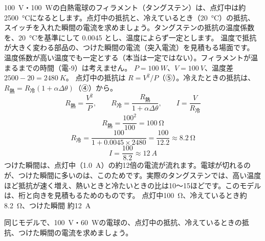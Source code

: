 \label{ph:電-4:ex5}
\begin{phreidai}[電球をつけた瞬間の電流]
\qty{100}{V}・\qty{100}{W}の白熱電球のフィラメント（タングステン）は、点灯中は約\qty{2500}{\celsius}になるとします。点灯中の抵抗と、冷えているとき（\qty{20}{\celsius}）の抵抗、スイッチを入れた瞬間の電流を求めましょう。タングステンの抵抗の温度係数を、\qty{20}{\celsius}を基準にして 0.0045 とし、温度によらず一定とします。
\phbamen
温度で抵抗が大きく変わる部品の、つけた瞬間の電流（突入電流）を見積もる場面です。
\phmushi
温度係数が高い温度でも一定とする（本当は一定ではない）。フィラメントが温まるまでの時間（電-9）は考えません。
\phzu
$P=\qty{100}{W}$、$V=\qty{100}{V}$、温度差 $2500-20=\qty{2480}{K}$。
\phriyu
点灯中の抵抗は $R=V^2/P$（⑤）。冷えたときの抵抗は、$R_{\text{熱}}=R_{\text{冷}}(1+\alpha\Delta\theta)$（④）から。
\phtateru
\[R_{\text{熱}}=\frac{V^2}{P},\qquad R_{\text{冷}}=\frac{R_{\text{熱}}}{1+\alpha\Delta\theta},\qquad I=\frac{V}{R_{\text{冷}}}\]
\phtoku
\[R_{\text{熱}}=\frac{100^2}{100}=\qty{100}{\ohm}\]
\[R_{\text{冷}}=\frac{100}{1+0.0045\times2480}=\frac{100}{12.2}\approx\qty{8.2}{\ohm}\]
\[I=\frac{100}{8.2}\approx\qty{12}{A}\]
\phtashikame
つけた瞬間は、点灯中（\qty{1.0}{A}）の約12倍の電流が流れます。電球が切れるのが、つけた瞬間に多いのは、このためです。実際のタングステンでは、高い温度ほど抵抗が速く増え、熱いときと冷たいときの比は10〜15ほどです。このモデルは、桁と向きを見積もるためのものです。
\kotae 点灯中\qty{100}{\ohm}、冷えているとき約\qty{8.2}{\ohm}、つけた瞬間 約\qty{12}{A}
\end{phreidai}
\begin{jibun}
同じモデルで、\qty{100}{V}・\qty{60}{W}の電球の、点灯中の抵抗、冷えているときの抵抗、つけた瞬間の電流を求めましょう。
\end{jibun}

